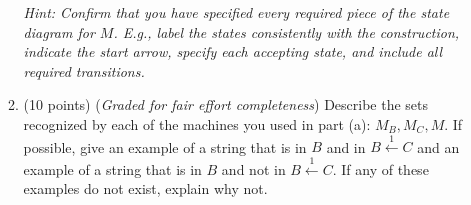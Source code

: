 \begin{enumerate}
\begin{enumerate}
{\it Hint: Confirm that you have specified every required piece of the state diagram for $M$. E.g., 
label the states consistently with the construction, indicate the start arrow, specify each
accepting state, and include all required transitions.}

\item (10 points) ({\it Graded for fair effort completeness}) Describe the sets recognized by each of the machines you used in part (a): $M_B, M_C, M$.
If possible, give an example of a string that is in $B$ and in $B \overset{1}{\leftarrow} C$
and an example of a string that is in $B$ and not in $B \overset{1}{\leftarrow} C$. If any of these examples
do not exist, explain why not.
\end{enumerate}

\end{enumerate}

